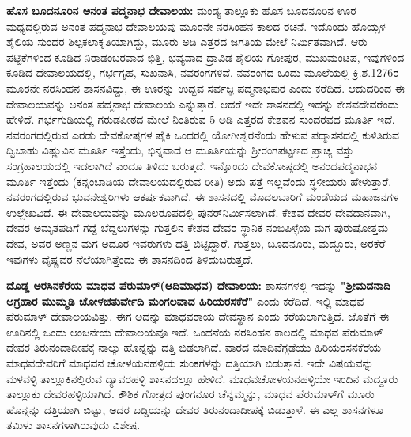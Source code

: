 \textbf{ಹೊಸ ಬೂದನೂರಿನ ಅನಂತ ಪದ್ಮನಾಭ ದೇವಾಲಯ:} ಮಂಡ್ಯ ತಾಲ್ಲೂಕು ಹೊಸ ಬೂದನೂರಿನ ಊರ ಮಧ್ಯದಲ್ಲಿರುವ ಅನಂತ ಪದ್ಮನಾಭ ದೇವಾಲಯವು ಮೂರನೇ ನರಸಿಂಹನ ಕಾಲದ ರಚನೆ. ಇದೊಂದು ಹೊಯ್ಸಳ ಶೈಲಿಯ ಸುಂದರ ಶಿಲ್ಪಕಲಾಕೃತಿಯಾಗಿದ್ದು, ಮೂರು ಅಡಿ ಎತ್ತರದ ಜಗತಿಯ ಮೇಲೆ ನಿರ್ಮಿತವಾಗಿದೆ. ಆರು ಪಟ್ಟಿಕೆಗಳಿಂದ ಕೂಡಿದ ನಿರಾಡಂಬರವಾದ ಭಿತ್ತಿ, ಭವ್ಯವಾದ ದ್ರಾವಿಡ ಶೈಲಿಯ ಗೋಪುರ, ಮುಖಮಂಟಪ, ಇವುಗಳಿಂದ ಕೂಡಿದ ದೇವಾಲಯದಲ್ಲಿ, ಗರ್ಭಗೃಹ, ಸುಖನಾಸಿ, ನವರಂಗಗಳಿವೆ. ನವರಂಗದ ಒಂದು ಮೂಲೆಯಲ್ಲಿ ಕ್ರಿ.ಶ.1276ರ ಮೂರನೇ ನರಸಿಂಹನ ಶಾಸನವಿದ್ದು, ಈ ಊರನ್ನು ಉದ್ಭವ ಸರ್ವಜ್ಞ ಪದ್ಮನಾಭಪುರ ಎಂದು ಕರೆದಿದೆ. ಆದುದರಿಂದ ಈ ದೇವಾಲಯವನ್ನು ಅನಂತ ಪದ್ಮನಾಭ ದೇವಾಲಯ ಎನ್ನುತ್ತಾರೆ. ಆದರೆ ಇದೇ ಶಾಸನದಲ್ಲಿ ಇದನ್ನು ಕೇಶವದೇವರೆಂದು ಹೇಳಿದೆ. ಗರ್ಭಗುಡಿಯಲ್ಲಿ ಗರುಡಪೀಠದ ಮೇಲೆ ನಿಂತಿರುವ 5 ಅಡಿ ಎತ್ತರದ ಕೇಶವನ ಸುಂದರವದ ಮೂರ್ತಿ ಇದೆ. ನವರಂಗದಲ್ಲಿರುವ ಎರಡು ದೇವಕೋಷ್ಠಗಳ ಪೈಕಿ ಒಂದರಲ್ಲಿ ಯೋಗೀಶ್ವರನೆಂದು ಹೇಳುವ ಪದ್ಮಾಸನದಲ್ಲಿ ಕುಳಿತಿರುವ ದ್ವಿಬಾಹು ವಿಷ್ಣುವಿನ ಮೂರ್ತಿ ಇತ್ತೆಂದು, ಭಿನ್ನವಾದ ಆ ಮೂರ್ತಿಯನ್ನು ಶ‍್ರೀರಂಗಪಟ್ಟಣದ ಪ್ರಾಚ್ಯ ವಸ್ತು ಸಂಗ್ರಹಾಲಯದಲ್ಲಿ ಇಡಲಾಗಿದೆ ಎಂದೂ ತಿಳಿದು ಬರುತ್ತದೆ. ಇನ್ನೊಂದು ದೇವಕೋಷ್ಠದಲ್ಲಿ ಅನಂದಪದ್ಮನಾಭನ ಮೂರ್ತಿ ಇತ್ತೆಂದು (ಕನ್ನಂಬಾಡಿಯ ದೇವಾಲಯದಲ್ಲಿರುವ ರೀತಿ) ಅದು ಪತ್ತೆ ಇಲ್ಲವೆಂದು ಸ್ಥಳೀಯರು ಹೇಳುತ್ತಾರೆ. ನವರಂಗದಲ್ಲಿರುವ ಭುವನೇಶ್ವರಿಗಳು ಆಕರ್ಷಕವಾಗಿದೆ. ಈ ಶಾಸನದಲ್ಲಿ ಮೊದಲಬಾರಿಗೆ ಮಂಡೆಯದ ಮಹಾಜನಗಳ ಉಲ್ಲೇಖವಿದೆ. ಈ ದೇವಾಲಯವನ್ನು ಮೂಲರೂಪದಲ್ಲಿ ಪುನರ್​ನಿರ್ಮಿಸಲಾಗಿದೆ. ಕೇಶವ ದೇವರ ದೇವದಾನವಾಗಿ, ದೇವರ ಅಮೃತಪಡಿಗೆ ಗದ್ದೆ ಬೆದ್ದಲುಗಳನ್ನು ಗುತ್ತಲಿನ ಕೇಶವ ದೇವರ ಸ್ಥಾನಿಕ ನಂಬಿಪಿಳ್ಳೆಯ ಮಗ ಪುರುಷೋತ್ತಮ ದೇವ, ಅವರ ಅಣ್ಣನ ಮಗ ಅದೂರ ಇವರುಗಳು ದತ್ತಿ ಬಿಟ್ಟಿದ್ದಾರೆ. ಗುತ್ತಲು, ಬೂದನೂರು, ಮದ್ದೂರು, ಅರಕೆರೆ ಇವುಗಳು ವೈಷ್ಣವರ ನೆಲೆಯಾಗಿತ್ತೆಂದು ಈ ಶಾಸನದಿಂದ ತಿಳಿದುಬರುತ್ತದೆ.

\textbf{ದೊಡ್ಡ ಅರಸಿನಕೆರೆಯ ಮಾಧವ ಪೆರುಮಾಳ್​(ಆದಿಮಾಧವ) ದೇವಾಲಯ:} ಶಾಸನಗಳಲ್ಲಿ ಇದನ್ನು \textbf{"ಶ‍್ರೀಮದನಾದಿ ಅಗ್ರಹಾರ ಮುಮ್ಮಡಿ ಚೋಳಚತುರ್ವೇದಿ ಮಂಗಲವಾದ ಹಿರಿಯರಸಕೆರೆ"} ಎಂದು ಕರೆದಿದೆ. ಇಲ್ಲಿ ಮಾಧವ ಪೆರುಮಾಳ್​ ದೇವಾಲಯವಿತ್ತು. ಈಗ ಅದನ್ನು ಮಾಧವರಾಯ ದೇವಸ್ಥಾನ ಎಂದು ಕರೆಯಲಾಗುತ್ತಿದೆ. ಜೊತೆಗೆ ಈ ಊರಿನಲ್ಲಿ ಒಂದು ಆಂಜನೇಯ ದೇವಾಲಯವೂ ಇದೆ. ಒಂದನೆಯ ನರಸಿಂಹನ ಕಾಲದಲ್ಲಿ ಮಾಧವ ಪೆರುಮಾಳ್​ ದೇವರ ತಿರುನಂದಾದೀಪಕ್ಕೆ ನಾಲ್ಕು ಹೊನ್ನನ್ನು ದತ್ತಿ ಬಿಡಲಾಗಿದೆ. ವಾರದ ಮಾದಿವೆಗ್ಗಡೆಯು ಹಿರಿಯರಸನಕೆರೆಯ ಮಾಧವದೇವರಿಗೆ ಮಾಧವನ ಚೋಳಯನಹಳ್ಳಿಯ ಸುಂಕಗಳನ್ನು ದತ್ತಿಯಾಗಿ ಬಿಡುತ್ತಾನೆ. ಇದೇ ವಿಷಯವನ್ನು ಮಳವಳ್ಳಿ ತಾಲ್ಲೂಕಿನಲ್ಲಿರುವ ದ್ಯಾವರಹಳ್ಳಿ ಶಾಸನದಲ್ಲೂ ಹೇಳಿದೆ. ಮಾಧವಚೋಳಯನಹಳ್ಳಿಯೇ ಇಂದಿನ ಮದ್ದೂರು ತಾಲ್ಲೂಕು ದೇವರಹಳ್ಳಿಯಾಗಿದೆ. ಕೌಶಿಕ ಗೋತ್ರದ ಪುಂಗನೂರ ಚೆನ್ನಮ್ಮನ್ನು, ಮಾಧವ ಪೆರುಮಾಳ್​ಗೆ ಮೂರು ಹೊನ್ನನ್ನು ದತ್ತಿಯಾಗಿ ಬಿಟ್ಟು, ಅದರ ಬಡ್ಡಿಯನ್ನು ದೇವರ ತಿರುನಂದಾದೀಪಕ್ಕೆ ಬಿಡುತ್ತಾಳೆ. ಈ ಎಲ್ಲ ಶಾಸನಗಳೂ ತಮಿಳು ಶಾಸನಗಳಾಗಿರುವುದು ವಿಶೇಷ.

